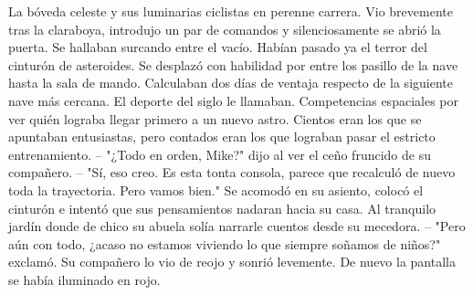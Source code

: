 \markdownRendererInterblockSeparator
{}La bóveda celeste y sus luminarias ciclistas en perenne carrera. Vio brevemente tras la claraboya, introdujo un par de comandos y silenciosamente se abrió la puerta. Se hallaban surcando entre el vacío. Habían pasado ya el terror del cinturón de asteroides. Se desplazó con habilidad por entre los pasillo de la nave hasta la sala de mando. Calculaban dos días de ventaja respecto de la siguiente nave más cercana. El deporte del siglo le llamaban. Competencias espaciales por ver quién lograba llegar primero a un nuevo astro. Cientos eran los que se apuntaban entusiastas, pero contados eran los que lograban pasar el estricto entrenamiento.\markdownRendererInterblockSeparator
{}-- "¿Todo en orden, Mike?" dijo al ver el ceño fruncido de su compañero.\markdownRendererInterblockSeparator
{}-- "Sí, eso creo. Es esta tonta consola, parece que recalculó de nuevo toda la trayectoria. Pero vamos bien."\markdownRendererInterblockSeparator
{}Se acomodó en su asiento, colocó el cinturón e intentó que sus pensamientos nadaran hacia su casa. Al tranquilo jardín donde de chico su abuela solía narrarle cuentos desde su mecedora.\markdownRendererInterblockSeparator
{}-- "Pero aún con todo, ¿acaso no estamos viviendo lo que siempre soñamos de niños?" exclamó. Su compañero lo vio de reojo y sonrió levemente. De nuevo la pantalla se había iluminado en rojo.\relax